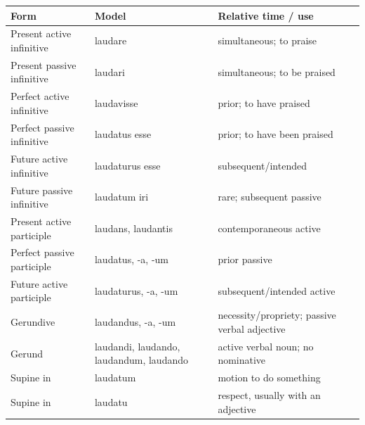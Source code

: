 


\begin{xltabular}{\linewidth}{@{}P{1.45in}P{2.2in}Y@{}}
  \toprule
  \textbf{Form} & \textbf{Model} & \textbf{Relative time / use} \\
  \midrule\endhead
  Present active infinitive & laudare & simultaneous; to praise \\
  Present passive infinitive & laudari & simultaneous; to be praised \\
  Perfect active infinitive & laudavisse & prior; to have praised \\
  Perfect passive infinitive & laudatus esse & prior; to have been praised \\
  Future active infinitive & laudaturus esse & subsequent/intended \\
  Future passive infinitive & laudatum iri & rare; subsequent passive \\
  Present active participle & laudans, laudantis & contemporaneous active \\
  Perfect passive participle & laudatus, -a, -um & prior passive \\
  Future active participle & laudaturus, -a, -um & subsequent/intended active \\
  Gerundive & laudandus, -a, -um & necessity/propriety; passive verbal adjective \\
  Gerund & laudandi, laudando, laudandum, laudando & active verbal noun; no nominative \\
  Supine in  & laudatum & motion to do something \\
  Supine in  & laudatu & respect, usually with an adjective \\
  \bottomrule
\end{xltabular}

